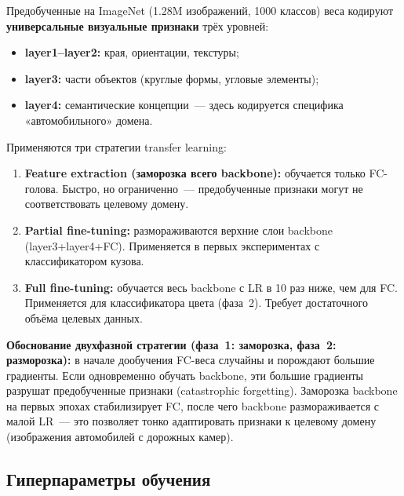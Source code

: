 \documentclass[14pt,a4paper]{report}
\numberwithin{equation}{chapter}
\numberwithin{figure}{chapter}
\numberwithin{table}{chapter}
\begin{document}
Предобученные на ImageNet (1.28M изображений, 1000 классов)
веса кодируют \textbf{универсальные визуальные признаки} трёх уровней:
\begin{itemize}[nosep]
  \item \textbf{layer1--layer2:} края, ориентации, текстуры;
  \item \textbf{layer3:} части объектов (круглые формы, угловые элементы);
  \item \textbf{layer4:} семантические концепции~---
    здесь кодируется специфика «автомобильного» домена.
\end{itemize}

Применяются три стратегии transfer learning:
\begin{enumerate}
  \item \textbf{Feature extraction (заморозка всего backbone):}
    обучается только FC-голова. Быстро, но ограниченно~---
    предобученные признаки могут не соответствовать целевому домену.
  \item \textbf{Partial fine-tuning:} размораживаются верхние слои
    backbone (layer3+layer4+FC). Применяется в первых экспериментах
    с классификатором кузова.
  \item \textbf{Full fine-tuning:} обучается весь backbone с LR
    в 10 раз ниже, чем для FC. Применяется для классификатора цвета
    (фаза~2). Требует достаточного объёма целевых данных.
\end{enumerate}

\textbf{Обоснование двухфазной стратегии (фаза~1: заморозка,
фаза~2: разморозка):} в начале дообучения FC-веса случайны
и порождают большие градиенты. Если одновременно обучать backbone,
эти большие градиенты разрушат предобученные признаки
(catastrophic forgetting). Заморозка backbone на первых эпохах
стабилизирует FC, после чего backbone размораживается с малой LR~---
это позволяет тонко адаптировать признаки к целевому домену
(изображения автомобилей с дорожных камер).

\subsection{Гиперпараметры обучения}
\end{document}
